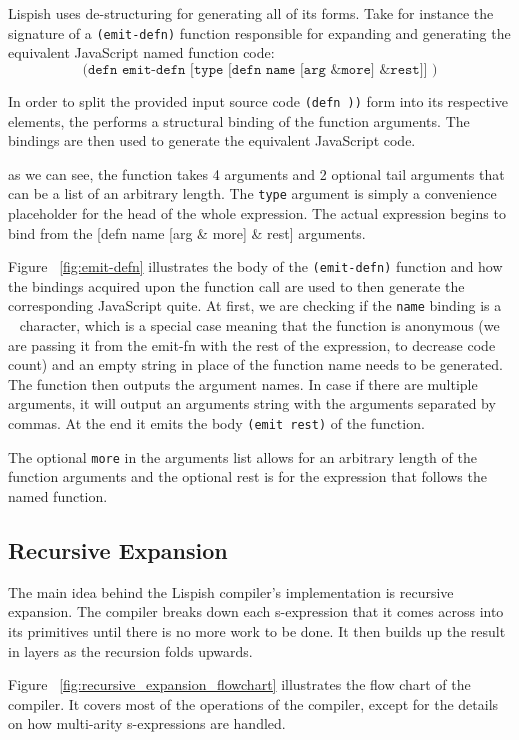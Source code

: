 Lispish uses de-structuring for generating all of its forms. 
Take for instance the signature of a \texttt{(emit-defn)} function responsible for expanding and generating the equivalent JavaScript named function code:
$$ \texttt{(defn emit-defn [type [defn name [arg \& more] \& rest]] )} $$

In order to split the provided input source code \texttt{(defn ))} form into its respective elements, the  performs a structural binding of the function arguments. The bindings are then used to generate the equivalent JavaScript code. 

as we can see, the function takes 4 arguments and 2 optional tail arguments that can be a list of an arbitrary length. The \texttt{type} argument is simply a convenience placeholder for the head of the whole expression.
The actual expression begins to bind from the [defn name [arg \& more] \& rest] arguments. 



Figure ~\ref{fig:emit-defn} illustrates the body of the \texttt{(emit-defn)} function and how the bindings acquired upon the function call are used to then generate the corresponding JavaScript quite. 
At first, we are checking if the \texttt{name} binding is a \texttt{~} character, which is a special case meaning that the function is anonymous (we are passing it from the emit-fn with the rest of the expression, to decrease code count) and an empty string in place of the function name needs to be generated. The function then outputs the argument names. In case if there are multiple arguments, it will output an arguments string with the arguments separated by commas. 
At the end it emits the body \texttt{(emit rest)} of the function.

The optional \texttt{more} in the arguments list allows for an arbitrary length of the function arguments and the optional rest is for the expression that follows the named function.

\subsection{Recursive Expansion}
The main idea behind the Lispish compiler's implementation is recursive expansion.
The compiler breaks down each s-expression that it comes across into its primitives until there is no more work to be done. It then builds up the result in layers as the recursion folds upwards. 

Figure ~\ref{fig:recursive_expansion_flowchart} illustrates the flow chart of the compiler. It covers most of the operations of the compiler, except for the details on how multi-arity s-expressions are handled.  

